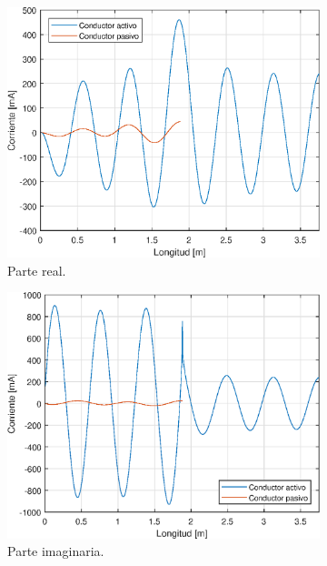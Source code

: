 \begin{figure}[H]
	\begin{subfigure}{0.5\textwidth}
		\includegraphics[scale=0.6]{imagenes/i_real_480_tierra.eps}
		\caption{Parte real.}
		\label{fig.i_real_480_tierra}
	\end{subfigure}
	\quad
	\begin{subfigure}{0.5\textwidth}
		\includegraphics[scale=0.6]{imagenes/i_imag_480_tierra.eps}
		\caption{Parte imaginaria.}
		\label{fig.i_imag_480_tierra}
	\end{subfigure}
	\quad
	\begin{subfigure}{0.5\textwidth}

\end{subfigure}
\end{figure}
